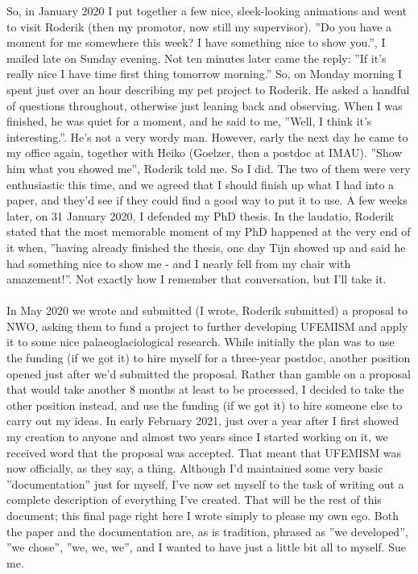 \documentclass{article}
\begin{document}
So, in January 2020 I put together a few nice, sleek-looking animations and went to visit Roderik (then my promotor, now still my supervisor). ''Do you have a moment for me somewhere this week? I have something nice to show you.'', I mailed late on Sunday evening. Not ten minutes later came the reply: ''If it's really nice I have time first thing tomorrow morning.'' So, on Monday morning I spent just over an hour describing my pet project to Roderik. He asked a handful of questions throughout, otherwise just leaning back and observing. When I was finished, he was quiet for a moment, and he said to me, ''Well, I think it's interesting.''. He's not a very wordy man. However, early the next day he came to my office again, together with Heiko (Goelzer, then a postdoc at IMAU). ''Show him what you showed me'', Roderik told me. So I did. The two of them were very enthusiastic this time, and we agreed that I should finish up what I had into a paper, and they'd see if they could find a good way to put it to use. A few weeks later, on 31 January 2020, I defended my PhD thesis. In the laudatio, Roderik stated that the most memorable moment of my PhD happened at the very end of it when, ''having already finished the thesis, one day Tijn showed up and said he had something nice to show me - and I nearly fell from my chair with amazement!''. Not exactly how I remember that conversation, but I'll take it.\\
\\
In May 2020 we wrote and submitted (I wrote, Roderik submitted) a proposal to NWO, asking them to fund a project to further developing UFEMISM and apply it to some nice palaeoglaciological research. While initially the plan was to use the funding (if we got it) to hire myself for a three-year postdoc, another position opened just after we'd submitted the proposal. Rather than gamble on a proposal that would take another 8 months at least to be processed, I decided to take the other position instead, and use the funding (if we got it) to hire someone else to carry out my ideas. In early February 2021, just over a year after I first showed my creation to anyone and almost two years since I started working on it, we received word that the proposal was accepted. That meant that UFEMISM was now officially, as they say, a thing. Although I'd maintained some very basic ''documentation'' just for myself, I've now set myself to the task of writing out a complete description of everything I've created. That will be the rest of this document; this final page right here I wrote simply to please my own ego. Both the paper and the documentation are, as is tradition, phrased as ''we developed'', ''we chose'', ''we, we, we'', and I wanted to have just a little bit all to myself. Sue me.
\end{document}

